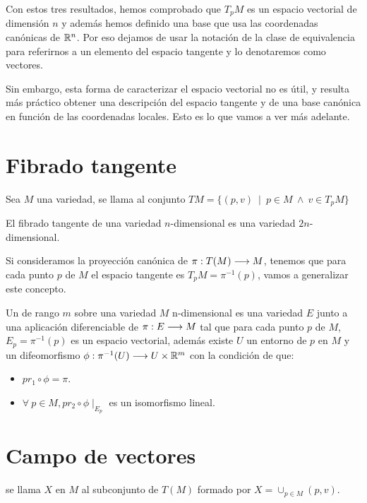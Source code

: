 Con estos tres resultados, hemos comprobado que $T_pM$ es un espacio vectorial de dimensión $n$
y además hemos definido una base que usa las coordenadas canónicas de $\mathbb{R}^n$.
Por eso dejamos de usar la notación de la clase de equivalencia para referirnos a un elemento del
espacio tangente y lo denotaremos como vectores.

Sin embargo, esta forma de caracterizar el espacio vectorial no es útil, y resulta más práctico
obtener una descripción del espacio tangente y de una base canónica en función de las coordenadas
locales.
Esto es lo que vamos a ver más adelante.


\section{Fibrado tangente}\label{sec:fibrado-tangente}
\begin{definition}
  Sea $M$ una variedad, se llama  al
  conjunto $TM=\{(p,v)\ \mid\ p\in M\ \land\ v\in T_pM\}$
\end{definition}

\begin{proposition}
  El fibrado tangente de una variedad $n$-dimensional es una variedad $2n$-dimensional.
\end{proposition}

Si consideramos la proyección canónica de $\pi:T(M)\longrightarrow M$, tenemos que para cada punto $p$ de
$M$ el espacio tangente es $T_pM=\pi^{-1}(p)$, vamos a generalizar este concepto.

\begin{definition}
  Un  de rango $m$ sobre una variedad $M$
  n-dimensional es una variedad $E$ junto a una aplicación diferenciable de $\pi:E\longrightarrow M$ tal
  que para cada punto $p$ de $M$, $E_p=\pi^{-1}(p)$ es un espacio vectorial, además existe $U$ un
  entorno de $p$ en $M$ y un difeomorfismo $\phi:\pi^{-1}(U)\longrightarrow U\times\mathbb{R}^m$ con la condición
  de que:
  \begin{itemize}
    \item $pr_1\circ\phi=\pi$.
    \item $\forall\ p\in M, pr_2\circ\phi\mid_{E_p}$ es un isomorfismo lineal.
  \end{itemize}
\end{definition}


\section{Campo de vectores}\label{sec:campo-de-vectores}
\begin{definition}
  se llama  $X$ en $M$ al subconjunto de $T(M)$ formado por
  $X=\cup_{p\in M}(p,v)$.
\end{definition}

